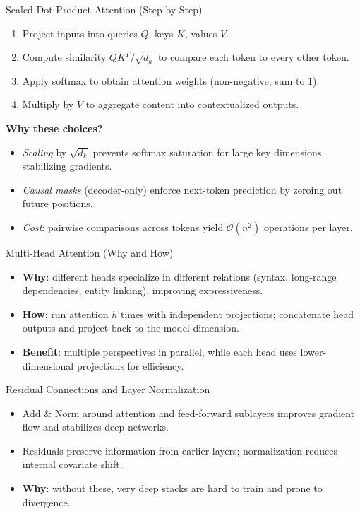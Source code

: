 \documentclass[aspectratio=169]{beamer}
\begin{document}
\begin{frame}{Scaled Dot-Product Attention (Step-by-Step)}
  \begin{enumerate}
    \item Project inputs into queries $Q$, keys $K$, values $V$.
    \item Compute similarity $QK^T / \sqrt{d_k}$ to compare each token to every other token.
    \item Apply softmax to obtain attention weights (non-negative, sum to 1).
    \item Multiply by $V$ to aggregate content into contextualized outputs.
  \end{enumerate}
  \vspace{0.5em}
  \textbf{Why these choices?}
  \begin{itemize}
    \item \emph{Scaling} by $\sqrt{d_k}$ prevents softmax saturation for large key dimensions, stabilizing gradients.
    \item \emph{Causal masks} (decoder-only) enforce next-token prediction by zeroing out future positions.
    \item \emph{Cost}: pairwise comparisons across tokens yield $\mathcal{O}(n^2)$ operations per layer.
  \end{itemize}
\end{frame}

\begin{frame}{Multi-Head Attention (Why and How)}
  \begin{itemize}
    \item \textbf{Why}: different heads specialize in different relations (syntax, long-range dependencies, entity linking), improving expressiveness.
    \item \textbf{How}: run attention $h$ times with independent projections; concatenate head outputs and project back to the model dimension.
    \item \textbf{Benefit}: multiple perspectives in parallel, while each head uses lower-dimensional projections for efficiency.
  \end{itemize}
\end{frame}

\begin{frame}{Residual Connections and Layer Normalization}
  \begin{itemize}
    \item Add \& Norm around attention and feed-forward sublayers improves gradient flow and stabilizes deep networks.
    \item Residuals preserve information from earlier layers; normalization reduces internal covariate shift.
    \item \textbf{Why}: without these, very deep stacks are hard to train and prone to divergence.
  \end{itemize}
\end{frame}
\end{document}
